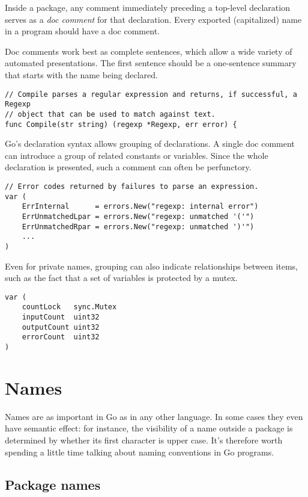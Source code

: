 Inside a package, any comment immediately preceding a top-level
declaration serves as a \emph{doc comment} for that declaration. Every
exported (capitalized) name in a program should have a doc comment.

Doc comments work best as complete sentences, which allow a wide variety
of automated presentations. The first sentence should be a one-sentence
summary that starts with the name being declared.

\begin{Verbatim}[frame=single]
// Compile parses a regular expression and returns, if successful, a Regexp
// object that can be used to match against text.
func Compile(str string) (regexp *Regexp, err error) {
\end{Verbatim}

Go's declaration syntax allows grouping of declarations. A single doc
comment can introduce a group of related constants or variables. Since
the whole declaration is presented, such a comment can often be
perfunctory.

\begin{Verbatim}[frame=single]
// Error codes returned by failures to parse an expression.
var (
    ErrInternal      = errors.New("regexp: internal error")
    ErrUnmatchedLpar = errors.New("regexp: unmatched '('")
    ErrUnmatchedRpar = errors.New("regexp: unmatched ')'")
    ...
)
\end{Verbatim}

Even for private names, grouping can also indicate relationships between
items, such as the fact that a set of variables is protected by a mutex.

\begin{Verbatim}[frame=single]
var (
    countLock   sync.Mutex
    inputCount  uint32
    outputCount uint32
    errorCount  uint32
)
\end{Verbatim}

\section*{Names}

Names are as important in Go as in any other language. In some cases
they even have semantic effect: for instance, the visibility of a name
outside a package is determined by whether its first character is upper
case. It's therefore worth spending a little time talking about naming
conventions in Go programs.

\subsection*{Package names}

